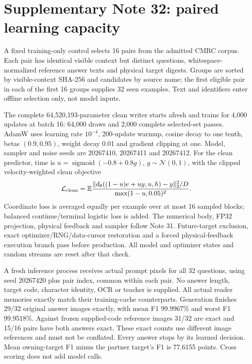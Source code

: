 \documentclass[10pt,a4paper]{article}
\begin{document}
\section*{Supplementary Note 32: paired learning capacity}
A fixed training-only control selects 16 pairs from the admitted CMRC corpus.
Each pair has identical visible context but distinct questions, whitespace-
normalized reference answer texts and physical target digests. Groups are
sorted by visible-context SHA-256 and candidates by source name; the first
eligible pair in each of the first 16 groups supplies 32 seen examples.
Text and identifiers enter offline selection only, not model inputs.

The complete 64,520,193-parameter clean writer starts afresh and trains for
4,000 updates at batch 16: 64,000 draws and 2,000 complete selected-set passes.
AdamW uses learning rate $10^{-4}$, 200-update warmup, cosine decay to one
tenth, betas $(0.9,0.95)$, weight decay 0.01 and gradient clipping at one.
Model, sampler and noise seeds are 20267410, 20267411 and 20267412.
For the clean predictor, time is $u=\operatorname{sigmoid}(-0.8+0.8g)$,
$g\sim\mathcal N(0,1)$, with the clipped velocity-weighted clean objective
\begin{equation}
 \mathcal L_{\rm clean}=
 \mathbb E\frac{\|d_\theta((1-u)e+uy,u,h)-y\|_2^2/D}
 {\max(1-u,0.05)^2}.
\end{equation}
Coordinate loss is averaged equally per example over at most 16 sampled
blocks; balanced continue/terminal logistic loss is added. The numerical
body, FP32 projection, physical feedback and sampler follow Note 31.
Future-target exclusion, exact optimizer/RNG/data-cursor restoration and a
forced physical-feedback execution branch pass before production. All model
and optimizer states and random streams are reset after that check.

A fresh inference process receives actual prompt pixels for all 32 questions,
using seed 20267420 plus pair index, common within each pair. No answer
length, target code, character identity, OCR or teacher is supplied.
All actual reader memories exactly match their training-cache counterparts.
Generation finishes 29/32 original answer images exactly, with mean F1
99.9967\% and worst F1 99.9518\%. Against frozen supplied-code reference
images 31/32 are exact and 15/16 pairs have both answers exact. These exact
counts use different image references and must not be conflated. Every
answer stops by its learned decision. Mean owning-target F1 minus the
partner target's F1 is 77.6155 points. Cross scoring does not add model calls.
\end{document}
